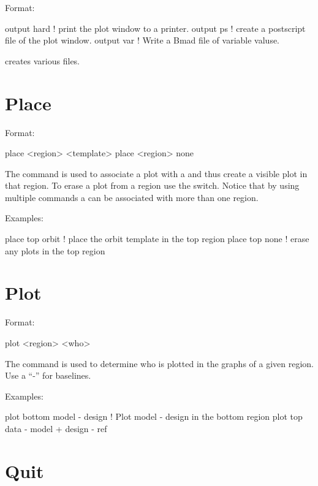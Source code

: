Format:
\begin{example}
  output hard     ! print the plot window to a printer.
  output ps       ! create a postscript file of the plot window.
  output var      ! Write a Bmad file of variable valuse.
\end{example}

\vskip 0.2in
 creates various files.

\section{Place}
\label{s:place}

Format:
\begin{example}
  place <region> <template>
  place <region> none
\end{example}

\vskip 0.2in 
The  command is used to associate a  plot
with a  and thus create a visible plot in that region. To
erase a plot from a region use the  switch. Notice that by
using multiple  commands a  can be associated
with more than one region.

Examples:
\begin{example}
  place top orbit  ! place the orbit template in the top region
  place top none   ! erase any plots in the top region
\end{example}

\section{Plot}
\label{s:plot}

Format:
\begin{example}
  plot <region> <who>
\end{example}

\vskip 0.2in 
The  command is used to determine who is plotted
in the graphs of a given region. Use a ``-'' for baselines. 

Examples:
\begin{example}
  plot bottom model - design       ! Plot model - design in the bottom region
  plot top data - model + design - ref 
\end{example}

\section{Quit}
\label{s:quit}

